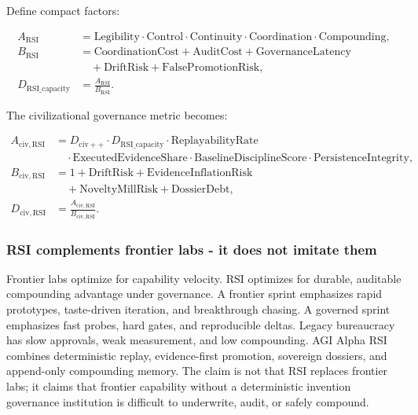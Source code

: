 Define compact factors:

\[
\begin{aligned}
A_{\mathrm{RSI}} &=
\mathrm{Legibility}\cdot\mathrm{Control}\cdot\mathrm{Continuity}
\cdot\mathrm{Coordination}\cdot\mathrm{Compounding},\\
B_{\mathrm{RSI}} &=
\mathrm{CoordinationCost}+\mathrm{AuditCost}+\mathrm{GovernanceLatency}\\
&\quad+\mathrm{DriftRisk}+\mathrm{FalsePromotionRisk},\\
D_{\mathrm{RSI\_capacity}} &= \frac{A_{\mathrm{RSI}}}{B_{\mathrm{RSI}}}.
\end{aligned}
\]

The civilizational governance metric becomes:

\[
\begin{aligned}
A_{\mathrm{civ,RSI}} &=
D_{\mathrm{civ++}}\cdot D_{\mathrm{RSI\_capacity}}
\cdot\mathrm{ReplayabilityRate}\\
&\quad\cdot\mathrm{ExecutedEvidenceShare}
\cdot\mathrm{BaselineDisciplineScore}
\cdot\mathrm{PersistenceIntegrity},\\
B_{\mathrm{civ,RSI}} &=
1+\mathrm{DriftRisk}+\mathrm{EvidenceInflationRisk}\\
&\quad+\mathrm{NoveltyMillRisk}+\mathrm{DossierDebt},\\
D_{\mathrm{civ,RSI}} &= \frac{A_{\mathrm{civ,RSI}}}{B_{\mathrm{civ,RSI}}}.
\end{aligned}
\]

\subsubsection{RSI complements frontier labs - it does not imitate
them}\label{rsi-complements-frontier-labs---it-does-not-imitate-them}

Frontier labs optimize for capability velocity. RSI optimizes for
durable, auditable compounding advantage under governance. A frontier
sprint emphasizes rapid prototypes, taste-driven iteration, and
breakthrough chasing. A governed sprint emphasizes fast probes, hard
gates, and reproducible deltas. Legacy bureaucracy has slow approvals,
weak measurement, and low compounding. AGI Alpha RSI combines
deterministic replay, evidence-first promotion, sovereign dossiers, and
append-only compounding memory. The claim is not that RSI replaces
frontier labs; it claims that frontier capability without a
deterministic invention governance institution is difficult to
underwrite, audit, or safely compound.

